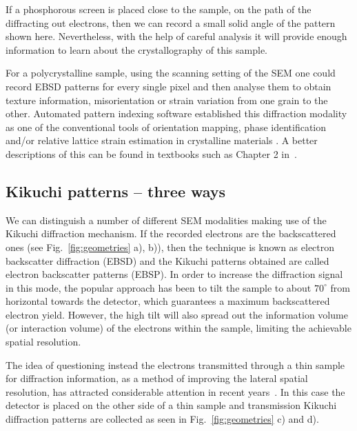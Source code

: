  If a phosphorous screen is placed close to the sample, on the path of the diffracting out electrons, then we can record a small solid angle of the pattern shown here. Nevertheless, with the help of careful analysis it will provide enough information to learn about the crystallography of this sample. 
 
 For a polycrystalline sample, using the scanning setting of the SEM one could record  EBSD patterns for every single pixel and then analyse them to obtain texture information, misorientation or strain variation from one grain to the other.  Automated pattern indexing software established this diffraction modality as one of the conventional tools of orientation mapping, phase identification and/or relative lattice strain estimation in crystalline materials \cite{schwartz2009a}. A better descriptions of this can be found in textbooks such as Chapter 2 in~\cite{Maitland07}.



\subsection{Kikuchi patterns -- three ways}
\label{sec:Kikuchi}





We can distinguish a number of different SEM modalities making use of the Kikuchi diffraction mechanism. If the recorded electrons are the backscattered ones (see Fig.~\ref{fig:geometries} a), b)), then the technique is known as electron backscatter diffraction (EBSD) and the Kikuchi patterns obtained are called electron backscatter patterns (EBSP).  In order to increase the diffraction signal in this mode, the popular approach has been to tilt the sample to about $70^{\circ}$ from horizontal towards the detector, which guarantees a maximum backscattered electron yield. However, the high tilt will also spread out the information volume (or interaction volume) of the electrons within the sample, limiting the achievable spatial resolution.


The idea of questioning instead the electrons transmitted through a thin sample for diffraction information, as a method of improving the lateral spatial resolution, has attracted considerable attention in recent years~\cite{Trimby12,Keller12}. In this case the detector is placed on the other side of a thin sample and transmission Kikuchi diffraction patterns are collected as seen in Fig.~\ref{fig:geometries} c) and d).


